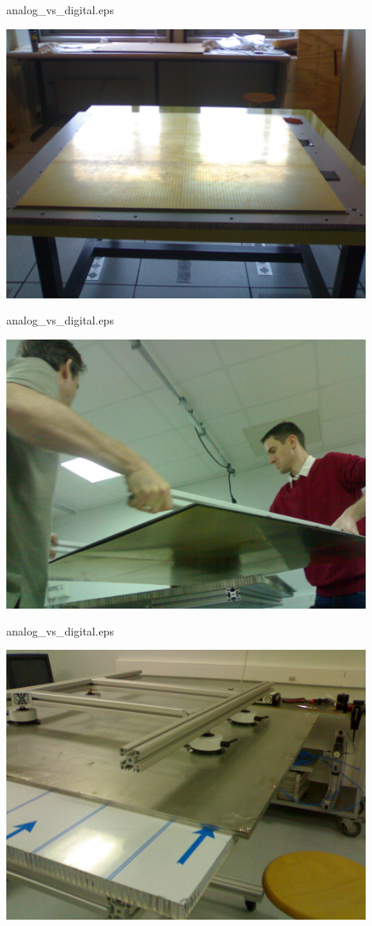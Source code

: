 \documentclass[10pt]{beamer}
\begin{document}
\begin{frame}{analog\_vs\_digital.eps}
    \centerline{\includegraphics[width=0.9\textwidth]{images/1m2Pad}}
\end{frame}
\begin{frame}{analog\_vs\_digital.eps}
    \centerline{\includegraphics[width=0.9\textwidth]{images/1m2Cover}}
\end{frame}
\begin{frame}{analog\_vs\_digital.eps}
    \centerline{\includegraphics[width=0.9\textwidth]{images/1m2Cassette}}
\end{frame}
\end{document}
